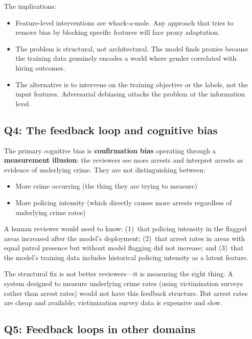 The implications:
\begin{itemize}
    \item Feature-level interventions are whack-a-mole. Any approach that tries to remove bias by blocking specific features will face proxy adaptation.
    \item The problem is structural, not architectural. The model finds proxies because the training data genuinely encodes a world where gender correlated with hiring outcomes.
    \item The alternative is to intervene on the training objective or the labels, not the input features. Adversarial debiasing attacks the problem at the information level.
\end{itemize}

\subsection*{Q4: The feedback loop and cognitive bias}

The primary cognitive bias is \textbf{confirmation bias} operating through a \textbf{measurement illusion}: the reviewers see more arrests and interpret arrests as evidence of underlying crime. They are not distinguishing between:
\begin{itemize}
    \item More crime occurring (the thing they are trying to measure)
    \item More policing intensity (which directly causes more arrests regardless of underlying crime rates)
\end{itemize}

A human reviewer would need to know: (1)~that policing intensity in the flagged areas increased after the model's deployment; (2)~that arrest rates in areas with equal patrol presence but without model flagging did not increase; and (3)~that the model's training data includes historical policing intensity as a latent feature.

The structural fix is not better reviewers---it is measuring the right thing. A system designed to measure underlying crime rates (using victimization surveys rather than arrest rates) would not have this feedback structure. But arrest rates are cheap and available; victimization survey data is expensive and slow.

\subsection*{Q5: Feedback loops in other domains}

